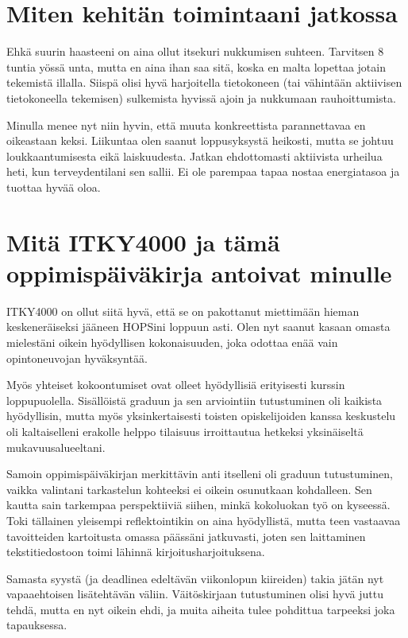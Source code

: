 \documentclass[utf8]{gradu3}
\begin{document}
\section{Miten kehitän toimintaani jatkossa}

Ehkä suurin haasteeni on aina ollut itsekuri nukkumisen suhteen. Tarvitsen 8
tuntia yössä unta, mutta en aina ihan saa sitä, koska en malta lopettaa
jotain tekemistä illalla. Siispä olisi hyvä harjoitella tietokoneen (tai
vähintään aktiivisen tietokoneella tekemisen) sulkemista hyvissä ajoin ja
nukkumaan rauhoittumista.

Minulla menee nyt niin hyvin, että muuta konkreettista parannettavaa en
oikeastaan keksi. Liikuntaa olen saanut loppusyksystä heikosti, mutta se
johtuu loukkaantumisesta eikä laiskuudesta. Jatkan ehdottomasti aktiivista
urheilua heti, kun terveydentilani sen sallii. Ei ole parempaa tapaa nostaa
energiatasoa ja tuottaa hyvää oloa.

\section{Mitä ITKY4000 ja tämä oppimispäiväkirja antoivat minulle}

ITKY4000 on ollut siitä hyvä, että se on pakottanut miettimään hieman
keskeneräiseksi jääneen HOPSini loppuun asti. Olen nyt saanut kasaan omasta
mielestäni oikein hyödyllisen kokonaisuuden, joka odottaa enää vain
opintoneuvojan hyväksyntää.

Myös yhteiset kokoontumiset ovat olleet hyödyllisiä erityisesti kurssin
loppupuolella. Sisällöistä graduun ja sen arviointiin tutustuminen oli
kaikista hyödyllisin, mutta myös yksinkertaisesti toisten opiskelijoiden
kanssa keskustelu oli kaltaiselleni erakolle helppo tilaisuus irroittautua
hetkeksi yksinäiseltä mukavuusalueeltani.

Samoin oppimispäiväkirjan merkittävin anti itselleni oli graduun
tutustuminen, vaikka valintani tarkastelun kohteeksi ei oikein osunutkaan
kohdalleen. Sen kautta sain tarkempaa perspektiiviä siihen, minkä kokoluokan
työ on kyseessä. Toki tällainen yleisempi reflektointikin on aina
hyödyllistä, mutta teen vastaavaa tavoitteiden kartoitusta omassa päässäni
jatkuvasti, joten sen laittaminen tekstitiedostoon toimi lähinnä
kirjoitusharjoituksena.

Samasta syystä (ja deadlinea edeltävän viikonlopun kiireiden) takia jätän nyt
vapaaehtoisen lisätehtävän väliin. Väitöskirjaan tutustuminen olisi hyvä
juttu tehdä, mutta en nyt oikein ehdi, ja muita aiheita tulee pohdittua
tarpeeksi joka tapauksessa.
\end{document}
